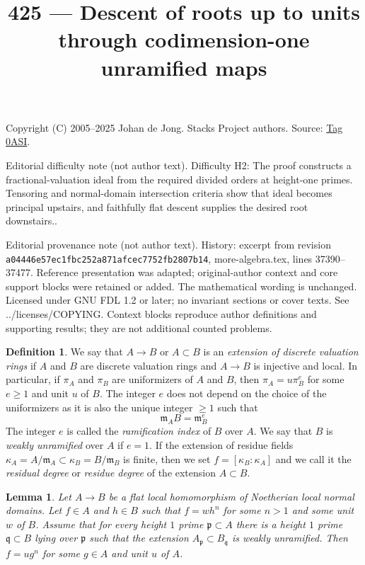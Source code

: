\documentclass{amsart}
\theoremstyle{plain}
\newtheorem{lemma}[subsection]{Lemma}
\theoremstyle{definition}
\newtheorem{definition}[subsection]{Definition}
\theoremstyle{remark}
\numberwithin{equation}{subsection}
\begin{document}
\title[Stacks Project, Tag 0ASI]{425 --- Descent of roots up to units through codimension-one unramified maps}
\maketitle
\noindent Copyright (C) 2005--2025 Johan de Jong. Stacks Project authors. Source: \href{https://stacks.math.columbia.edu/tag/0ASI}{Tag 0ASI}.

\noindent Editorial difficulty note (not author text). Difficulty H2: The proof constructs a fractional-valuation ideal from the required divided orders at height-one primes. Tensoring and normal-domain intersection criteria show that ideal becomes principal upstairs, and faithfully flat descent supplies the desired root downstairs..

\noindent Editorial provenance note (not author text). History: excerpt from revision \texttt{a0444\allowbreak 6e57e\allowbreak c1fbc\allowbreak 252a8\allowbreak 71afc\allowbreak ec775\allowbreak 2fb28\allowbreak 07b14}, more-algebra.tex, lines 37390--37477. Reference presentation was adapted; original-author context and core support blocks were retained or added. The mathematical wording is unchanged. Licensed under GNU FDL 1.2 or later; no invariant sections or cover texts. See ../licenses/COPYING. Context blocks reproduce author definitions and supporting results; they are not additional counted problems.

\begin{definition}
\label{definition-extension-discrete-valuation-rings}
We say that $A \to B$ or $A \subset B$ is an
{\it extension of discrete valuation rings} if $A$ and $B$ are
discrete valuation rings and $A \to B$ is injective and local.
In particular, if $\pi_A$ and $\pi_B$ are uniformizers of
$A$ and $B$, then $\pi_A = u \pi_B^e$ for some $e \geq 1$ and unit
$u$ of $B$. The integer $e$ does not depend on the choice of
the uniformizers as it is also the unique integer $\geq 1$ such that
$$
\mathfrak m_A B = \mathfrak m_B^e
$$
The integer $e$ is called the {\it ramification index} of $B$ over $A$.
We say that $B$ is {\it weakly unramified} over $A$ if $e = 1$.
If the extension of residue fields
$\kappa_A = A/\mathfrak m_A \subset \kappa_B = B/\mathfrak m_B$
is finite, then we set $f = [\kappa_B : \kappa_A]$ and we
call it the {\it residual degree} or {\it residue degree}
of the extension $A \subset B$.
\end{definition}

\begin{lemma}
\label{lemma-extension-normal-domains-and-roots}
Let $A \to B$ be a flat local homomorphism of Noetherian local normal domains.
Let $f \in A$ and $h \in B$ such that $f = w h^n$ for some $n > 1$ and some
unit $w$ of $B$. Assume that for every height $1$ prime
$\mathfrak p \subset A$ there is a height $1$ prime
$\mathfrak q \subset B$ lying over $\mathfrak p$
such that the extension $A_\mathfrak p \subset B_\mathfrak q$ is
weakly unramified. Then $f = u g^n$ for some $g \in A$ and unit $u$ of $A$.
\end{lemma}
\end{document}

